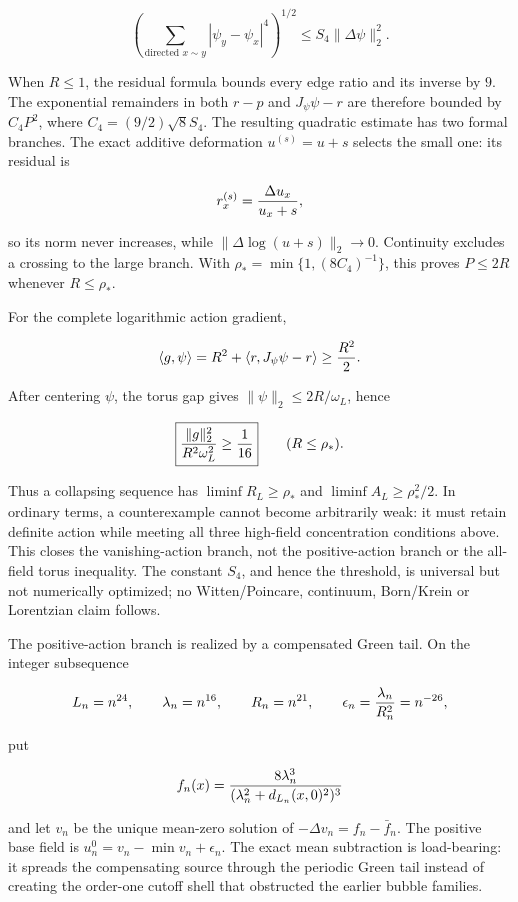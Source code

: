 \documentclass[11pt]{article}
\theoremstyle{definition}
\theoremstyle{remark}
\begin{document}
\[
 \left(\sum_{\text{directed }x\sim y}
 |\psi_y-\psi_x|^4\right)^{1/2}
 \leq S_4\lVert\Delta\psi\rVert_2^2.
\]

When \(R\leq1\), the residual formula bounds every edge ratio and its inverse
by \(9\).  The exponential remainders in both \(r-p\) and
\(J_\psi\psi-r\) are therefore bounded by \(C_4P^2\), where
\(C_4=(9/2)\sqrt8S_4\).  The resulting quadratic estimate has two formal
branches.  The exact additive deformation \(u^{(s)}=u+s\) selects the small
one: its residual is

\[
 r_x^{(s)}={\Delta u_x\over u_x+s},
\]

so its norm never increases, while
\(\lVert\Delta\log(u+s)\rVert_2\to0\).  Continuity excludes a crossing to the
large branch.  With
\(\rho_*=\min\{1,(8C_4)^{-1}\}\), this proves \(P\leq2R\) whenever
\(R\leq\rho_*\).

For the complete logarithmic action gradient,

\[
 \langle g,\psi\rangle
 =R^2+\langle r,J_\psi\psi-r\rangle\geq {R^2\over2}.
\]

After centering \(\psi\), the torus gap gives
\(\lVert\psi\rVert_2\leq2R/\omega_L\), hence

\[
 \boxed{{\lVert g\rVert_2^2\over R^2\omega_L^2}\geq {1\over16}}
 \qquad (R\leq\rho_*).
\]

Thus a collapsing sequence has
\(\liminf R_L\geq\rho_*\) and
\(\liminf A_L\geq\rho_*^2/2\).  In ordinary terms, a counterexample cannot
become arbitrarily weak: it must retain definite action while meeting all
three high-field concentration conditions above.  This closes the
vanishing-action branch, not the positive-action branch or the all-field
torus inequality.  The constant \(S_4\), and hence the threshold, is universal
but not numerically optimized; no Witten/Poincare, continuum, Born/Krein or
Lorentzian claim follows.

The positive-action branch is realized by a compensated Green tail.  On the
integer subsequence

\[
 L_n=n^{24},\qquad \lambda_n=n^{16},\qquad R_n=n^{21},\qquad
 \epsilon_n={\lambda_n\over R_n^2}=n^{-26},
\]

put

\[
 f_n(x)={8\lambda_n^3\over
  (\lambda_n^2+d_{L_n}(x,0)^2)^3}
\]

and let \(v_n\) be the unique mean-zero solution of
\(-\Delta v_n=f_n-\bar f_n\).  The positive base field is
\(u_n^0=v_n-\min v_n+\epsilon_n\).  The exact mean subtraction is
load-bearing: it spreads the compensating source through the periodic Green
tail instead of creating the order-one cutoff shell that obstructed the
earlier bubble families.
\end{document}
